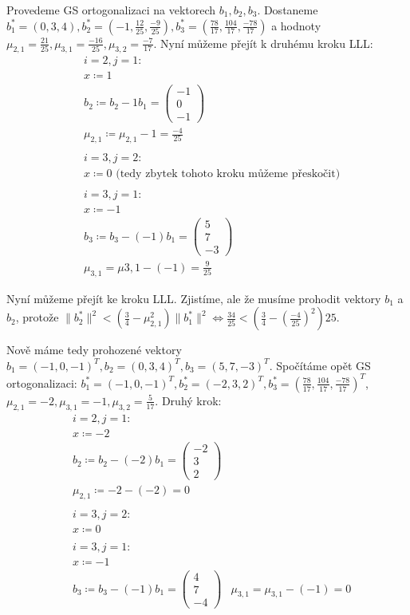 \documentclass[12pt, a4paper]{article}
\begin{document}
Provedeme GS ortogonalizaci na vektorech $b_1, b_2, b_3$. Dostaneme $b_1^* = (0, 3, 4), b_2^* = (-1, \frac{12}{25}, \frac{-9}{25}), b_3^* = (\frac{78}{17}, \frac{104}{17}, \frac{-78}{17})$ a hodnoty $\mu_{2,1} = \frac{21}{25}, \mu_{3,1} = \frac{-16}{25}, \mu_{3,2} = \frac{-7}{17}$. Nyní můžeme přejít k druhému kroku LLL:
\begin{align*}
&i=2, j=1:\\
&x \coloneqq 1\\
&b_2 \coloneqq b_2-1b_1=\begin{pmatrix}
-1\\
0\\
-1
\end{pmatrix}\\
&\mu_{2,1} \coloneqq \mu_{2,1}-1 = \frac{-4}{25}\\\\
&i=3, j=2:\\
&x \coloneqq 0 \text{ (tedy zbytek tohoto kroku můžeme přeskočit)}\\\\
&i=3, j=1:\\
&x \coloneqq -1\\
&b_3 \coloneqq b_3 - (-1)b_1 = \begin{pmatrix}
5\\
7\\
-3
\end{pmatrix}\\
&\mu_{3,1} = \mu{3,1} - (-1) = \frac{9}{25}
\end{align*}

Nyní můžeme přejít ke  kroku LLL. Zjistíme, ale že musíme prohodit vektory $b_1$ a $b_2$, protože $\| b_2^* \|^2 < (\frac{3}{4} - \mu_{2,1}^2)\| b_1^* \|^2 \iff \frac{34}{25} < (\frac{3}{4}-(\frac{-4}{25})^2)25$. 

Nově máme tedy prohozené vektory $b_1 = (-1, 0, -1)^T, b_2 = (0, 3, 4)^T, b_3 = (5, 7, -3)^T$. Spočítáme opět GS ortogonalizaci: $b_1^* = (-1, 0, -1)^T, b_2^* = (-2, 3, 2)^T, b_3^* = (\frac{78}{17}, \frac{104}{17}, \frac{-78}{17})^T$, $\mu_{2,1} = -2, \mu_{3,1} = -1, \mu_{3,2} = \frac{5}{17}$. Druhý krok:
\begin{align*}
&i=2, j=1:\\
&x \coloneqq -2\\
&b_2 \coloneqq  b_2 - (-2)b_1 = \begin{pmatrix}
-2\\
3\\
2
\end{pmatrix}\\
&\mu_{2,1} \coloneqq -2 - (-2) = 0\\\\
&i=3, j=2:\\
&x \coloneqq 0\\\\
&i=3, j=1:\\
&x \coloneqq -1\\
&b_3 \coloneqq b_3 - (-1)b_1 = \begin{pmatrix}
4\\
7\\
-4
\end{pmatrix}
&\mu_{3,1} = \mu_{3,1} - (-1) = 0
\end{align*}
\end{document}
